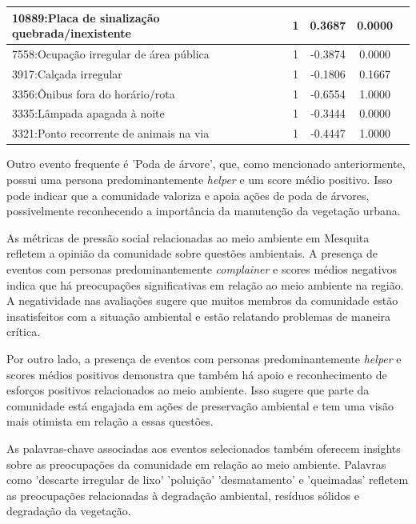 \begin{table}[htbp]
\begin{tabular}{|l|c|c|c|c|}
		10889:Placa de sinalização quebrada/inexistente & 1                & 0.3687         & 0.0000           \\
		\hline
		7558:Ocupação irregular de área pública         & 1                & -0.3874        & 0.0000           \\
		\hline
		3917:Calçada irregular                          & 1                & -0.1806        & 0.1667           \\
		\hline
		3356:Ônibus fora do horário/rota                & 1                & -0.6554        & 1.0000           \\
		\hline
		3335:Lâmpada apagada à noite                    & 1                & -0.3444        & 0.0000           \\
		\hline
		3321:Ponto recorrente de animais na via         & 1                & -0.4447        & 1.0000           \\
		\hline
	\end{tabular}
\end{table}

Outro evento frequente é 'Poda de árvore', que, como mencionado anteriormente, possui uma persona predominantemente \textit{helper} e um score médio positivo. Isso pode indicar que a comunidade valoriza e apoia ações de poda de árvores, possivelmente reconhecendo a importância da manutenção da vegetação urbana.

As métricas de pressão social relacionadas ao meio ambiente em Mesquita refletem a opinião da comunidade sobre questões ambientais. A presença de eventos com personas predominantemente \textit{complainer} e scores médios negativos indica que há preocupações significativas em relação ao meio ambiente na região. A negatividade nas avaliações sugere que muitos membros da comunidade estão insatisfeitos com a situação ambiental e estão relatando problemas de maneira crítica.

Por outro lado, a presença de eventos com personas predominantemente \textit{helper} e scores médios positivos demonstra que também há apoio e reconhecimento de esforços positivos relacionados ao meio ambiente. Isso sugere que parte da comunidade está engajada em ações de preservação ambiental e tem uma visão mais otimista em relação a essas questões.

As palavras-chave associadas aos eventos selecionados também oferecem insights sobre as preocupações da comunidade em relação ao meio ambiente. Palavras como 'descarte irregular de lixo' 'poluição' 'desmatamento' e 'queimadas' refletem as preocupações relacionadas à degradação ambiental, resíduos sólidos e degradação da vegetação.

